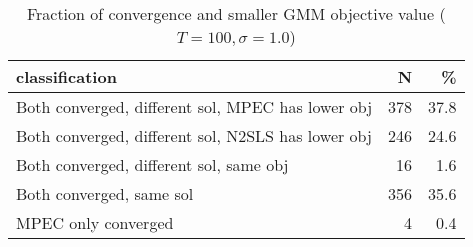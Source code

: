 \begin{table}

\caption{\label{tab:unnamed-chunk-13}Fraction of convergence and smaller GMM objective value ($T=100,\sigma=1.0$)}
\centering
\begin{tabular}[t]{lrr}
\toprule
classification & N & \%\\
\midrule
Both converged, different sol, MPEC has lower obj & 378 & 37.8\\
Both converged, different sol, N2SLS has lower obj & 246 & 24.6\\
Both converged, different sol, same obj & 16 & 1.6\\
Both converged, same sol & 356 & 35.6\\
MPEC only converged & 4 & 0.4\\
\bottomrule
\end{tabular}
\end{table}
